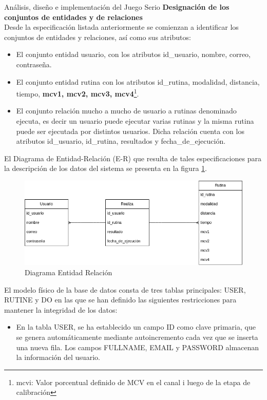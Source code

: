 \begin{thesischapter}{2} {Análisis, diseño e implementación del Juego Serio}
    \vspace{10pt}
    \textbf{Designación de los conjuntos de entidades y de relaciones}\\
    Desde la especificación listada anteriormente se comienzan a
    identificar los conjuntos de entidades y relaciones, así como sus atributos:
    \begin{itemize}
        \item El conjunto entidad usuario, con los atributos id\_usuario, nombre, correo, contraseña.
        \item El conjunto entidad rutina con los atributos id\_rutina, modalidad, distancia, tiempo, \textbf{mcv1, mcv2, mcv3, mcv4}\footnote{mcvi: Valor porcentual definido de MCV en el canal i luego de la etapa de calibración}.
        \item El conjunto relación mucho a mucho de usuario a rutinas denominado ejecuta, es decir un usuario puede ejecutar 
        varias rutinas y la misma rutina puede ser ejecutada por distintos usuarios. Dicha relación cuenta con los atributos id\_usuario, id\_rutina, resultados y fecha\_de\_ejecución. 
    \end{itemize}
    
    \vspace{10pt}
    El Diagrama de Entidad-Relación (E-R) que resulta de tales especificaciones para la descripción de los datos del sistema se presenta en la figura \ref{fig: diagram-er}.
    \begin{figure}[ht]
        \centering
        \includegraphics[scale=0.5]{images/diagram-er.png}
        \caption{Diagrama Entidad Relación}
        \label{fig: diagram-er}
    \end{figure}

    El modelo físico de la base de datos consta de tres tablas principales: USER, RUTINE y DO en las que se han definido las siguientes 
    restricciones para mantener la integridad de los datos:

    \vspace{10pt}
    \begin{itemize}
        \item En la tabla USER, se ha establecido un campo ID como clave primaria, que se genera automáticamente mediante autoincremento 
        cada vez que se inserta una nueva fila. Los campos FULLNAME, EMAIL y PASSWORD almacenan la información del usuario.
    

\end{itemize}
\end{thesischapter}
